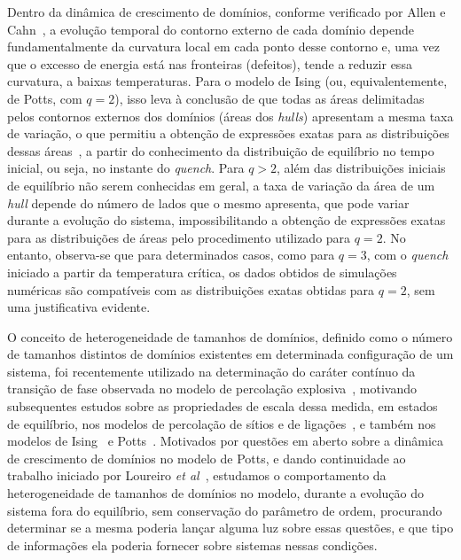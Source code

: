 Dentro da dinâmica de crescimento de domínios, conforme verificado por Allen e Cahn~\cite{AllenCahn}, a evolução temporal do contorno externo de cada domínio depende fundamentalmente da curvatura local em cada ponto desse contorno e, uma vez que o excesso de energia está nas fronteiras (defeitos), tende a reduzir essa curvatura, a baixas temperaturas. Para o modelo de Ising (ou, equivalentemente, de Potts, com $q=2$), isso leva à conclusão de que todas as áreas delimitadas pelos contornos externos dos domínios (áreas dos \textit{hulls}) apresentam a mesma taxa de variação, o que permitiu a obtenção de expressões exatas para as distribuições dessas áreas~\cite{PRLJeferson}, a partir do conhecimento da distribuição de equilíbrio no tempo inicial, ou seja, no instante do \textit{quench}. Para $q>2$, além das distribuições iniciais de equilíbrio não serem conhecidas em geral, a taxa de variação da área de um \textit{hull} depende do número de lados que o mesmo apresenta, que pode variar durante a evolução do sistema, impossibilitando a obtenção de expressões exatas para as distribuições de áreas pelo procedimento utilizado para $q=2$. No entanto, observa-se que para determinados casos, como para $q=3$, com o \textit{quench} iniciado a partir da temperatura crítica, os dados obtidos de simulações numéricas são compatíveis com as distribuições exatas obtidas para $q=2$, sem uma justificativa evidente.

O conceito de heterogeneidade de tamanhos de domínios, definido como o número de tamanhos distintos de domínios existentes em determinada configuração de um sistema, foi recentemente utilizado na determinação do caráter contínuo da transição de fase observada no modelo de percolação explosiva~\cite{LeeKimPark}, motivando subsequentes estudos sobre as propriedades de escala dessa medida, em estados de equilíbrio, nos modelos de percolação de sítios e de ligações~\cite{NohLeePark}, e também nos modelos de Ising~\cite{JoYiBaekKim} e Potts~\cite{LvYangDeng}. Motivados por questões em aberto sobre a dinâmica de crescimento de domínios no modelo de Potts, e dando continuidade ao trabalho iniciado por Loureiro \textit{et al}~\cite{LoureiroPRE}, estudamos o comportamento da heterogeneidade de tamanhos de domínios no modelo, durante a evolução do sistema fora do equilíbrio, sem conservação do parâmetro de ordem, procurando determinar se a mesma poderia lançar alguma luz sobre essas questões, e que tipo de informações ela poderia fornecer sobre sistemas nessas condições.

